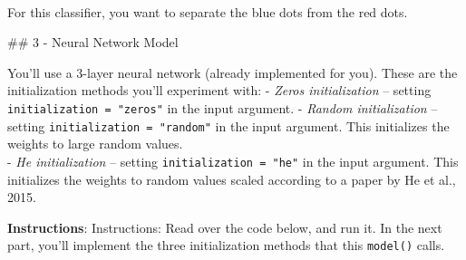 \documentclass[11pt]{article}
\begin{document}
    \begin{center}
    \end{center}
    { \hspace*{\fill} \\}
    
    For this classifier, you want to separate the blue dots from the red
dots.

    \#\# 3 - Neural Network Model

    You'll use a 3-layer neural network (already implemented for you). These
are the initialization methods you'll experiment with: - \emph{Zeros
initialization} -- setting \texttt{initialization\ =\ "zeros"} in the
input argument. - \emph{Random initialization} -- setting
\texttt{initialization\ =\ "random"} in the input argument. This
initializes the weights to large random values.\\
- \emph{He initialization} -- setting \texttt{initialization\ =\ "he"}
in the input argument. This initializes the weights to random values
scaled according to a paper by He et al., 2015.

\textbf{Instructions}: Instructions: Read over the code below, and run
it. In the next part, you'll implement the three initialization methods
that this \texttt{model()} calls.
\end{document}

